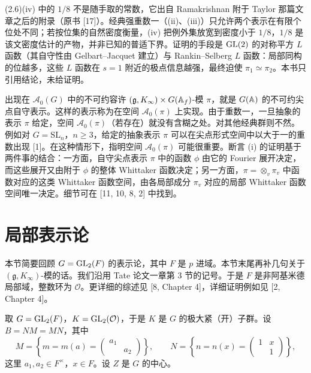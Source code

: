 \medskip
\begin{annote}
(2.6)(iv) 中的 $1/8$ 不是随手取的常数，它出自 Ramakrishnan 附于 Taylor 那篇文章之后的附录（原书 [17]）。经典强重数一（(ii)、(iii)）只允许两个表示在有限个位处不同；若按位集的自然密度衡量，(iv) 把例外集放宽到密度小于 $1/8$，$1/8$ 是该文密度估计的产物，并非已知的普适下界。证明的手段是 $\mathrm{GL}(2)$ 的对称平方 $L$ 函数（其自守性由 Gelbart–Jacquet 建立）与 Rankin–Selberg $L$ 函数：局部同构的位越多，这些 $L$ 函数在 $s=1$ 附近的极点信息越强，最终迫使 $\pi_1\simeq\pi_2$。本书只引用结论，未给证明。

\par{}
\end{annote}

出现在 $\mathcal{A}_0(G)$ 中的不可约容许 $(\mathfrak{g},K_\infty)\times G(\mathbb{A}_f)$-模 $\pi$，就是 $G(\mathbb{A})$ 的不可约尖点自守表示。这样的表示称为在空间 $\mathcal{A}_0(\pi)$ 上实现。由于重数一，一旦抽象的表示 $\pi$ 给定，空间 $\mathcal{A}_0(\pi)$（若存在）就没有含糊之处。对其他经典群则不然。例如对 $G=\mathrm{SL}_n$，$n\ge 3$，给定的抽象表示 $\pi$ 可以在尖点形式空间中以大于一的重数出现 [1]。在这种情形下，指明空间 $\mathcal{A}_0(\pi)$ 可能很重要。断言 (i) 的证明基于两件事的结合：一方面，自守尖点表示 $\pi$ 中的函数 $\phi$ 由它的 Fourier 展开决定，而这些展开又由附于 $\phi$ 的整体 Whittaker 函数决定；另一方面，$\pi=\otimes_v\pi_v$ 中函数对应的这类 Whittaker 函数空间，由各局部成分 $\pi_v$ 对应的局部 Whittaker 函数空间唯一决定。细节可在 [11, 10, 8, 2] 中找到。

\section{局部表示论}

本节简要回顾 $G=\mathrm{GL}_2(F)$ 的表示论，其中 $F$ 是 $p$ 进域。本节末尾再补几句关于 $(\mathfrak{g},K_\infty)$-模的话。我们沿用 Tate 论文一章第 3 节的记号。于是 $F$ 是非阿基米德局部域，整数环为 $\mathcal{O}$。更详细的综述见 [8, Chapter 4]，详细证明例如见 [2, Chapter 4]。

取 $G=\mathrm{GL}_2(F)$，$K=\mathrm{GL}_2(\mathcal{O})$，于是 $K$ 是 $G$ 的极大紧（开）子群。设 $B=NM=MN$，其中
\[
M=\left\{m=m(a)=\begin{pmatrix}a_1&\\&a_2\end{pmatrix}\right\},
\qquad
N=\left\{n=n(x)=\begin{pmatrix}1&x\\&1\end{pmatrix}\right\},
\]
这里 $a_1,a_2\in F^\times$，$x\in F$。设 $Z$ 是 $G$ 的中心。

